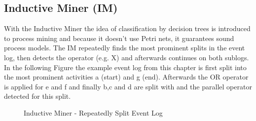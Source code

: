 \subsection{Inductive Miner (IM)}
With the Inductive Miner the idea of classification by decision trees is introduced to process mining and because it doesn't use Petri nets, it guarantees sound process models.
The IM repeatedly finds the most prominent splits in the event log, then detects the operator (e.g. X) and afterwards continues on both sublogs.\\
In the following Figure the example event log from this chapter is first split into the most prominent activities a (start) and g (end). Afterwards the OR operator is applied for e and f and finally b,c and d are split with and the parallel operator detected for this split.\protect\cite{Buijs2017}

\begin{figure} [H]
\caption{Inductive Miner - Repeatedly Split Event Log\protect\cite{Buijs2017}} 
\end{figure} 



